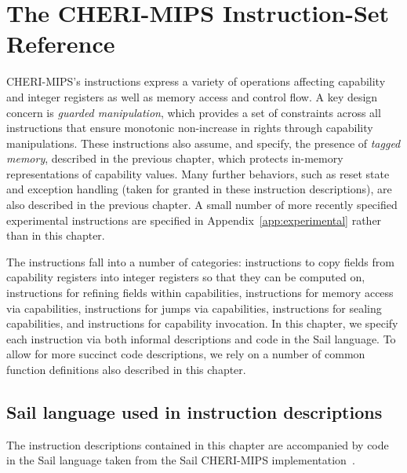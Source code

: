 \chapter{The CHERI-MIPS Instruction-Set Reference}
\label{chap:isaref-mips}

CHERI-MIPS's instructions express a variety of operations affecting capability
and integer registers as well as memory access and control flow.
A key design concern is {\em guarded manipulation}, which provides
a set of constraints
across all instructions that ensure monotonic non-increase in rights through
capability manipulations.
These instructions also assume, and specify, the presence of {\em tagged
memory}, described in the previous chapter, which protects in-memory
representations of capability values.
Many further behaviors, such as reset state and exception handling (taken for
granted in these instruction descriptions), are also described in the previous
chapter.
A small number of more recently specified experimental instructions are
specified in Appendix~\ref{app:experimental} rather than in this chapter.

The instructions fall into a number of categories: instructions to copy
fields from capability registers into integer registers so that they
can be computed on, instructions for refining fields within capabilities, instructions for memory access via
capabilities, instructions for jumps via capabilities, instructions for sealing capabilities, and instructions for capability invocation.
In this chapter, we specify each instruction via both informal descriptions
and code in the Sail language.
To allow for more succinct code descriptions, we rely on a number of
common function definitions also described in this chapter.


\newcommand{\cchecktag}{\emph{cb}.\ctag{} is not set.}

\section{Sail language used in instruction descriptions}

The instruction descriptions contained in this chapter are accompanied
by code in the Sail language taken from the Sail CHERI-MIPS
implementation~\cite{sail-cheri-mips}.

